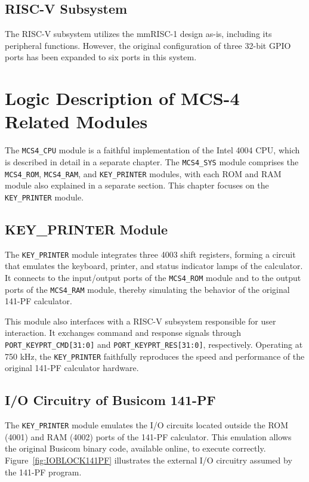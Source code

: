 \subsection{RISC-V Subsystem}
The RISC-V subsystem utilizes the mmRISC-1\cite{mmRISC-1} design as-is, including its peripheral functions. However, the original configuration of three 32-bit GPIO ports has been expanded to six ports in this system.

\section{Logic Description of MCS-4 Related Modules}
The \texttt{MCS4\_CPU} module is a faithful implementation of the Intel 4004 CPU, which is described in detail in a separate chapter. The \texttt{MCS4\_SYS} module comprises the \texttt{MCS4\_ROM}, \texttt{MCS4\_RAM}, and \texttt{KEY\_PRINTER} modules, with each ROM and RAM module also explained in a separate section. This chapter focuses on the \texttt{KEY\_PRINTER} module.

\subsection{KEY\_PRINTER Module}
The \texttt{KEY\_PRINTER} module integrates three 4003 shift registers, forming a circuit that emulates the keyboard, printer, and status indicator lamps of the calculator. It connects to the input/output ports of the \texttt{MCS4\_ROM} module and to the output ports of the \texttt{MCS4\_RAM} module, thereby simulating the behavior of the original 141-PF calculator.

This module also interfaces with a RISC-V subsystem responsible for user interaction. It exchanges command and response signals through \texttt{PORT\_KEYPRT\_CMD[31:0]} and \texttt{PORT\_KEYPRT\_RES[31:0]}, respectively. Operating at 750 kHz, the \texttt{KEY\_PRINTER} faithfully reproduces the speed and performance of the original 141-PF calculator hardware.

\subsection{I/O Circuitry of Busicom 141-PF}
The \texttt{KEY\_PRINTER} module emulates the I/O circuits located outside the ROM (4001) and RAM (4002) ports of the 141-PF calculator. This emulation allows the original Busicom binary code, available online, to execute correctly. Figure~\ref{fig:IOBLOCK141PF} illustrates the external I/O circuitry assumed by the 141-PF program.

